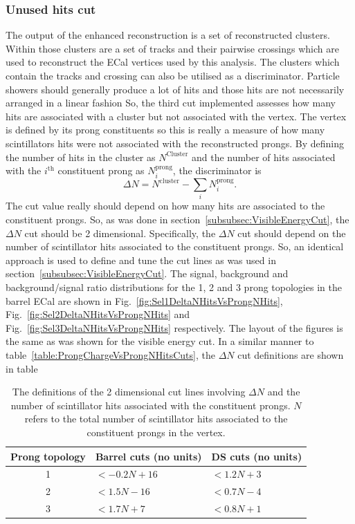 \subsubsection{Unused hits cut}
\label{subsubsec:UnusedHitsCuts}
The output of the enhanced reconstruction is a set of reconstructed clusters.  Within those clusters are a set of tracks and their pairwise crossings which are used to reconstruct the ECal vertices used by this analysis.  The clusters which contain the tracks and crossing can also be utilised as a discriminator.  Particle showers should generally produce a lot of hits and those hits are not necessarily arranged in a linear fashion  So, the third cut implemented assesses how many hits are associated with a cluster but not associated with the vertex.  The vertex is defined by its prong constituents so this is really a measure of how many scintillators hits were not associated with the reconstructed prongs.  By defining the number of hits in the cluster as $N^{\textrm{Cluster}}$ and the number of hits associated with the $i^{\textrm{th}}$ constituent prong as $N^{\textrm{prong}}_i$, the discriminator is
\begin{equation}
  \Delta N = N^{\textrm{cluster}} - \sum_i N^{\textrm{prong}}_i.
  \label{eqn:DeltaNHits}
\end{equation}
The cut value really should depend on how many hits are associated to the constituent prongs.  So, as was done in section~\ref{subsubsec:VisibleEnergyCut}, the $\Delta N$ cut should be 2 dimensional.  Specifically, the $\Delta N$ cut should depend on the number of scintillator hits associated to the constituent prongs.
\newline
\newline
So, an identical approach is used to define and tune the cut lines as was used in section~\ref{subsubsec:VisibleEnergyCut}.  The signal, background and background/signal ratio distributions for the 1, 2 and 3 prong topologies in the barrel ECal are shown in Fig.~\ref{fig:Sel1DeltaNHitsVsProngNHits}, Fig.~\ref{fig:Sel2DeltaNHitsVsProngNHits} and Fig.~\ref{fig:Sel3DeltaNHitsVsProngNHits} respectively.  The layout of the figures is the same as was shown for the visible energy cut.  In a similar manner to table~\ref{table:ProngChargeVsProngNHitsCuts}, the $\Delta N$ cut definitions are shown in table
\begin{table}
  \begin{tabular}{ c l l }
    Prong topology & Barrel cuts (no units) & DS cuts (no units) \\ \hline \hline
    1 & $<-0.2N + 16$ & $<1.2N + 3$ \\
    2 & $<1.5N - 16$ & $<0.7N - 4$ \\
    3 & $<1.7N + 7$ & $<0.8N + 1$ \\
  \end{tabular}
  \caption{The definitions of the 2 dimensional cut lines involving $\Delta N$ and the number of scintillator hits associated with the constituent prongs. $N$ refers to the total number of scintillator hits associated to the constituent prongs in the vertex.}
  \label{table:DeltaNHitsVsProngNHitsCuts}
\end{table}

